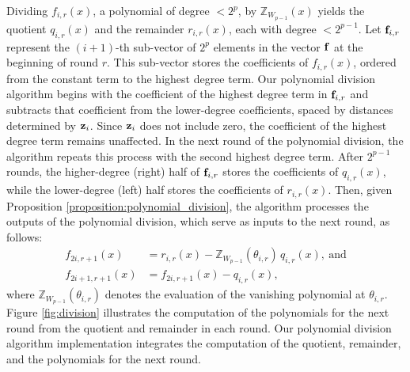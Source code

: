 Dividing \( f_{i,r}(x) \), a polynomial of degree $< 2^p$, by \( \mathbb{Z}_{W_{p-1}}(x) \) yields the quotient \( q_{i,r}(x) \) and the remainder \( r_{i,r}(x) \), each with degree $< 2^{p-1}$. Let ${\bf{f}}_{i,r}$ represent the $(i+1)$-th sub-vector of $2^p$ elements in the vector ${\bf{f}}$ at the beginning of round $r$. This sub-vector stores the coefficients of \( f_{i,r}(x) \), ordered from the constant term to the highest degree term. Our polynomial division algorithm begins with the coefficient of the highest degree term in ${\bf{f}}_{i,r}$ and subtracts that coefficient from the lower-degree coefficients, spaced by distances determined by ${\bf{z}}_i$. Since ${\bf{z}}_i$ does not include zero, the coefficient of the highest degree term remains unaffected. In the next round of the polynomial division, the algorithm repeats this process with the second highest degree term. After $2^{p-1}$ rounds, the higher-degree (right) half of ${\bf{f}}_{i,r}$ stores the coefficients of \( q_{i,r}(x) \), while the lower-degree (left) half stores the coefficients of \( r_{i,r}(x) \). 
Then, given Proposition \ref{proposition:polynomial_division}, the algorithm processes the outputs of the polynomial division, which serve as inputs to the next round, as follows:
\begin{align*}
	f_{2i,r+1}(x) &= r_{i,r}(x) - \mathbb{Z}_{W_{p-1}}(\theta_{i,r})\, q_{i,r}(x),\ \text{and}\\
	f_{2i+1,r+1}(x) &= f_{2i,r+1}(x) - q_{i,r}(x),
\end{align*}
where $\mathbb{Z}_{W_{p-1}}(\theta_{i,r})$ denotes the evaluation of the vanishing polynomial at $\theta_{i,r}$. Figure \ref{fig:division} illustrates the computation of the polynomials for the next round from the quotient and remainder in each round. Our polynomial division algorithm implementation integrates the computation of the quotient, remainder, and the polynomials for the next round. 




